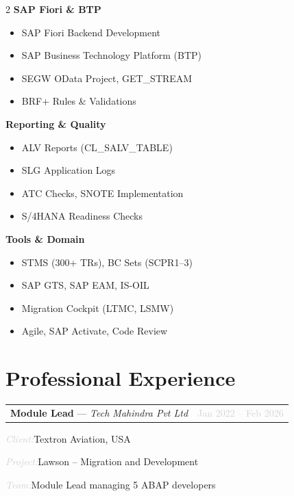 \documentclass[10pt, a4paper]{article}
\makeatletter
\newcommand{\cventry}[3]{%
  \noindent
  \begin{tabularx}{\linewidth}{@{}X r@{}}
    \textbf{#1} --- \textit{#2} & \textcolor{lightgray}{\small #3}
  \end{tabularx}
  \vspace{2pt}
}
\newcommand{\clientinfo}[2]{%
  \noindent\textcolor{lightgray}{\small\textit{#1:}}\enspace#2\par
}
\makeatother
\begin{document}
\begin{paracol}{2}
  \textbf{SAP Fiori \& BTP}
  \begin{itemize}
    \item SAP Fiori Backend Development
    \item SAP Business Technology Platform (BTP)
    \item SEGW OData Project, GET\_STREAM
    \item BRF+ Rules \& Validations
  \end{itemize}

  \textbf{Reporting \& Quality}
  \begin{itemize}
    \item ALV Reports (CL\_SALV\_TABLE)
    \item SLG Application Logs
    \item ATC Checks, SNOTE Implementation
    \item S/4HANA Readiness Checks
  \end{itemize}

  \textbf{Tools \& Domain}
  \begin{itemize}
    \item STMS (300+ TRs), BC Sets (SCPR1--3)
    \item SAP GTS, SAP EAM, IS-OIL
    \item Migration Cockpit (LTMC, LSMW)
    \item Agile, SAP Activate, Code Review
  \end{itemize}

\end{paracol}

\section{Professional Experience}

\cventry{Module Lead}{Tech Mahindra Pvt Ltd}{Jan 2022 -- Feb 2026}
\clientinfo{Client}{Textron Aviation, USA}
\clientinfo{Project}{Lawson -- Migration and Development}
\clientinfo{Team}{Module Lead managing 5 ABAP developers}
\end{document}

